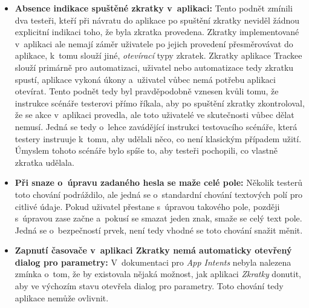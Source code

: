 \begin{itemize}
\item\textbf{Absence indikace spuštěné zkratky v~aplikaci:} Tento podnět zmínili dva testeři, kteří při návratu do aplikace po spuštění zkratky neviděl žádnou explicitní indikaci toho, že byla zkratka provedena. Zkratky implementované v~aplikaci ale nemají záměr uživatele po jejich provedení přesměrovávat do aplikace, k~tomu slouží jiné, \emph{otevírací} typy zkratek. Zkratky aplikace Trackee slouží primárně pro automatizaci, uživatel nebo automatizace tedy zkratku spustí, aplikace vykoná úkony a~uživatel vůbec nemá potřebu aplikaci otevírat. Tento podnět tedy byl pravděpodobně vznesen kvůli tomu, že instrukce scénáře testerovi přímo říkala, aby po spuštění zkratky zkontroloval, že se akce v~aplikaci provedla, ale toto uživatelé ve skutečnosti vůbec dělat nemusí. Jedná se tedy o~lehce zavádějící instrukci testovacího scénáře, která testery instruuje k~tomu, aby udělali něco, co není klasickým případem užití. Úmyslem tohoto scénáře bylo spíše to, aby testeři pochopili, co vlastně zkratka udělala.
\item\textbf{Při snaze o~úpravu zadaného hesla se maže celé pole:} Několik testerů toto chování podráždilo, ale jedná se o~standardní chování textových polí pro citlivé údaje. Pokud uživatel přestane s~úpravou takového pole, později s~úpravou zase začne a~pokusí se smazat jeden znak, smaže se celý text pole. Jedná se o~bezpečností prvek, není tedy vhodné se toto chování snažit měnit.
\item\textbf{Zapnutí časovače v~aplikaci Zkratky nemá automaticky otevřený dialog pro parametry:} V~dokumentaci pro \emph{App Intents} \cite{ios-app-intents} nebyla nalezena zmínka o~tom, že by existovala nějaká možnost, jak aplikaci \emph{Zkratky} donutit, aby ve výchozím stavu otevřela dialog pro parametry. Toto chování tedy aplikace nemůže ovlivnit.
\end{itemize}































































